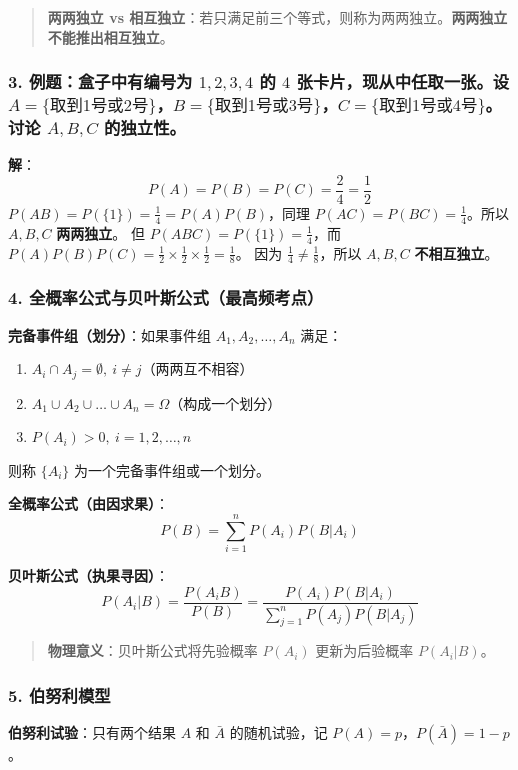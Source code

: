 \documentclass[12pt,a4paper]{ctexart}
\newenvironment{myquote}
  {\par\vspace{0.5em}\begin{quote}\sffamily\color{gray}}
  {\end{quote}\vspace{0.5em}}
\begin{document}
\begin{myquote}
    \textbf{两两独立 vs 相互独立}：若只满足前三个等式，则称为两两独立。\textbf{两两独立不能推出相互独立}。
\end{myquote}

\subsubsection{3. 例题：盒子中有编号为 $1,2,3,4$ 的 $4$ 张卡片，现从中任取一张。设 $A=\{取到1号或2号\}$，$B=\{取到1号或3号\}$，$C=\{取到1号或4号\}$。讨论 $A,B,C$ 的独立性。}

\textbf{解}：
\[
    P(A) = P(B) = P(C) = \frac{2}{4} = \frac{1}{2}
\]
$P(AB) = P(\{1\}) = \frac{1}{4} = P(A)P(B)$，同理 $P(AC)=P(BC)=\frac{1}{4}$。所以 $A, B, C$ \textbf{两两独立}。
但 $P(ABC) = P(\{1\}) = \frac{1}{4}$，而 $P(A)P(B)P(C) = \frac{1}{2} \times \frac{1}{2} \times \frac{1}{2} = \frac{1}{8}$。
因为 $\frac{1}{4} \ne \frac{1}{8}$，所以 $A, B, C$ \textbf{不相互独立}。

\subsubsection{4. 全概率公式与贝叶斯公式（最高频考点）}

\textbf{完备事件组（划分）}：如果事件组 $A_1, A_2, \dots, A_n$ 满足：
\begin{enumerate}[noitemsep]
    \item $A_i \cap A_j = \emptyset,\ i \ne j$（两两互不相容）
    \item $A_1 \cup A_2 \cup \dots \cup A_n = \Omega$（构成一个划分）
    \item $P(A_i) > 0,\ i = 1,2,\dots,n$
\end{enumerate}
则称 $\{A_i\}$ 为一个完备事件组或一个划分。

\textbf{全概率公式（由因求果）}：
\[
    P(B) = \sum_{i=1}^n P(A_i) P(B|A_i)
\]

\textbf{贝叶斯公式（执果寻因）}：
\[
    P(A_i|B) = \frac{P(A_i B)}{P(B)} = \frac{P(A_i) P(B|A_i)}{\sum_{j=1}^n P(A_j) P(B|A_j)}
\]

\begin{myquote}
    \textbf{物理意义}：贝叶斯公式将先验概率 $P(A_i)$ 更新为后验概率 $P(A_i|B)$。
\end{myquote}

\subsubsection{5. 伯努利模型}
\textbf{伯努利试验}：只有两个结果 $A$ 和 $\bar{A}$ 的随机试验，记 $P(A) = p$，$P(\bar{A}) = 1-p$。
\end{document}
